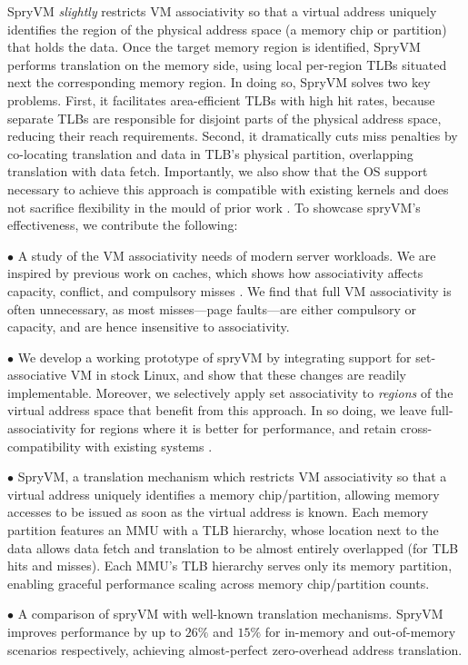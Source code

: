 SpryVM {\it slightly} restricts VM associativity so that a virtual
address uniquely identifies the region of the physical address space
(a memory chip or partition) that holds the data. Once the target
memory region is identified, SpryVM performs translation on the memory
side, using local per-region TLBs situated next the corresponding
memory region.  In doing so, SpryVM solves two key problems. First, it
facilitates area-efficient TLBs with high hit rates, because separate
TLBs are responsible for disjoint parts of the physical address space,
reducing their reach requirements. Second, it dramatically cuts miss
penalties by co-locating translation and data in TLB's physical
partition, overlapping translation with data fetch. Importantly, we
also show that the OS support necessary to achieve this approach is
compatible with existing kernels and does not sacrifice flexibility in
the mould of prior work \cite{basu:efficient,
  haria:devirtualizing}. To showcase spryVM's effectiveness, we
contribute the following:

\noindent $\bullet$ A study of the VM associativity needs of modern
server workloads. We are inspired by previous work on caches, which
shows how associativity affects capacity, conflict, and compulsory
misses \cite{hill:case}. We find that full VM associativity is often
unnecessary, as most misses---page faults---are either compulsory or
capacity, and are hence insensitive to associativity. 

\noindent $\bullet$ We develop a working prototype of spryVM by
integrating support for set-associative VM in stock Linux, and show
that these changes are readily implementable. Moreover, we selectively
apply set associativity to {\it regions} of the virtual address space
that benefit from this approach. In so doing, we leave
full-associativity for regions where it is better for performance, and
retain cross-compatibility with existing systems .

\noindent $\bullet$ SpryVM, a translation mechanism which restricts VM
associativity so that a virtual address uniquely identifies a memory
chip/partition, allowing memory accesses to be issued as soon as the
virtual address is known. Each memory partition features an MMU with a
TLB hierarchy, whose location next to the data allows data fetch and
translation to be almost entirely overlapped (for TLB hits and
misses). Each MMU's TLB hierarchy serves only its memory partition,
enabling graceful performance scaling across memory chip/partition
counts.

\noindent $\bullet$ A comparison of spryVM with well-known translation
mechanisms. SpryVM improves performance by up to $26\%$ and $15\%$ for
in-memory and out-of-memory scenarios respectively, achieving
almost-perfect zero-overhead address translation.
